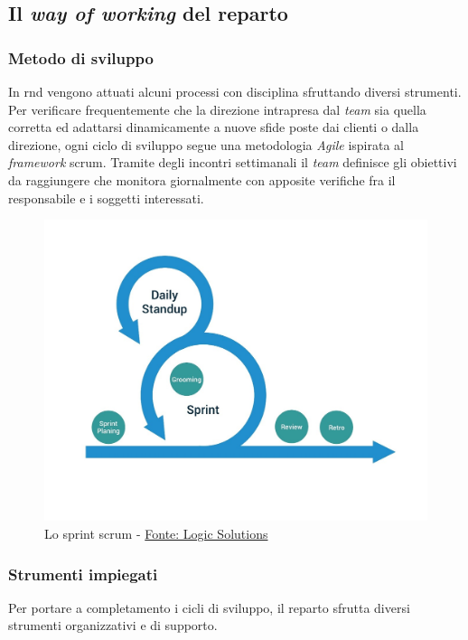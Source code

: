 \subsection{Il \textit{way of working} del reparto}
\subsubsection{Metodo di sviluppo}
In \acrshort{rnd} vengono attuati alcuni processi con disciplina sfruttando diversi strumenti.
Per verificare frequentemente che la direzione intrapresa dal \textit{team} sia quella corretta ed adattarsi dinamicamente a nuove sfide poste dai clienti o dalla direzione, ogni ciclo di sviluppo segue una metodologia \textit{Agile} ispirata al \textit{framework} \gls{scrum}\glsfirstoccur. Tramite degli incontri settimanali il \textit{team} definisce gli obiettivi da raggiungere che monitora giornalmente con apposite verifiche fra il responsabile e i soggetti interessati.

\begin{figure}[H] 
    \centering 
    \includegraphics[width=0.9\columnwidth]{immagini/scrum-blog.jpg} 
    \caption{Lo sprint \gls{scrum} - \href{https://www.logicsolutions.com/what-is-scrum-how-it-works/}{Fonte: Logic Solutions}}
    \label{fig:sprintScrum}
\end{figure}

\subsubsection{Strumenti impiegati}
Per portare a completamento i cicli di sviluppo, il reparto sfrutta diversi strumenti organizzativi e di supporto.
